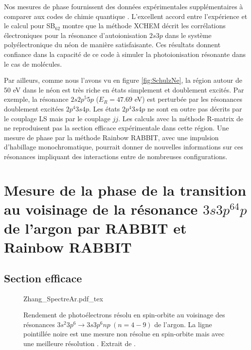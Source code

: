 Nos mesures de phase fournissent des données expérimentales supplémentaires à comparer aux codes de chimie quantique . L'excellent accord entre l'expérience et le calcul pour SB$_{62}$ montre que la méthode XCHEM décrit les corrélations électroniques pour la résonance d'autoionisation $2s3p$ dans le système polyélectronique du néon de manière satisfaisante. Ces résultats donnent confiance dans la capacité de ce code à simuler la photoionisation résonante dans le cas de molécules.

Par ailleurs, comme nous l'avons vu en figure \ref{fig:SchulzNe}, la région autour de 50 eV dans le néon est très riche en états simplement et doublement excités. Par exemple, la résonance $2s2p^{5}5p$ ($E_R = 47.69$ eV) est perturbée par les résonances doublement excitées $2p^{4}3s4p$. Les états $2p^{4}3s4p$ ne sont en outre pas décrits par le couplage LS mais par le couplage $jj$. Les calculs avec la méthode R-matrix de  ne reproduisent pas la section efficace expérimentale dans cette région. Une mesure de phase par la méthode Rainbow RABBIT, avec une impulsion d'habillage monochromatique, pourrait donner de nouvelles informations sur ces résonances impliquant des interactions entre de nombreuses configurations. 





\chapter[Mesure de la phase de la transition au voisinage de la résonance $3s3p^64p$ de l'argon par RABBIT et Rainbow RABBIT]{Mesure de la phase de la transition au voisinage de la résonance \MakeLowercase{$3s3p^64p$} de l'argon par RABBIT et Rainbow RABBIT}

\section{Section efficace}
\begin{figure}
\centering
\def\svgwidth{0.85\textwidth}
{Zhang_SpectreAr.pdf_tex}
\caption{Rendement de photoélectrons résolu en spin-orbite au voisinage des résonances $3s^2 3p^6 \rightarrow 3s 3p^6 np \: (n = 4 - 9) $ de l'argon. La ligne pointillée noire est une mesure non résolue en spin-orbite mais avec une meilleure résolution . Extrait de .}
\label{fig:Zhang_SpectreAr}
\end{figure}

